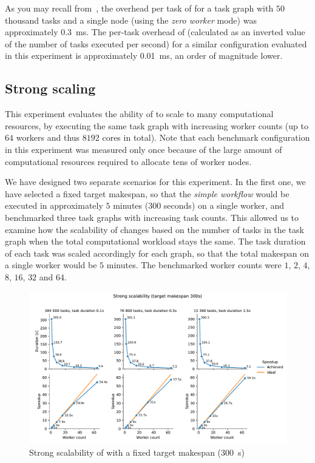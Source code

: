 As you may recall from~, the overhead per task of \dask{}
for a task graph with $50$ thousand tasks and a single node (using the
\emph{zero worker} mode) was approximately \SI{0.3}{\milli\second}. The per-task overhead of
\hyperqueue{} (calculated as an
inverted value of the number of tasks executed per second) for a similar configuration evaluated in this experiment is approximately
\SI{0.01}{\milli\second}, an order of magnitude lower.

\subsection{Strong scaling}
\label{sec:hq-exp-scalability}
This experiment evaluates the ability of \hyperqueue{} to scale to many computational
resources, by executing the same task graph with increasing worker counts (up to
$64$ workers and thus $8192$ cores in total). Note that each
benchmark configuration in this experiment was measured only once because of the large amount of
computational resources required to allocate tens of worker nodes.

We have designed two separate scenarios for this experiment. In the first one, we have selected a
fixed target makespan, so that the \emph{simple workflow} would be executed in approximately $5$
minutes ($300$ seconds) on a single worker, and benchmarked
three task graphs with increasing task counts. This allowed us to examine how the
scalability of \hyperqueue{} changes based on the number of tasks in the task graph when the total
computational workload stays the same. The task duration of each task was scaled accordingly for
each graph, so that the total makespan on a single worker would be $5$ minutes.
The benchmarked worker counts were $1$, $2$,
$4$, $8$, $16$, $32$
and $64$.

\begin{figure}[h]
	\centering
	\includegraphics[width=\textwidth]{imgs/hq/charts/scalability-fixed-makespan}
	\caption{Strong scalability of \hyperqueue{} with a fixed target makespan
	(\SI{300}{\second})}
	\label{fig:hq-scalability-fixed-makespan}
\end{figure}

